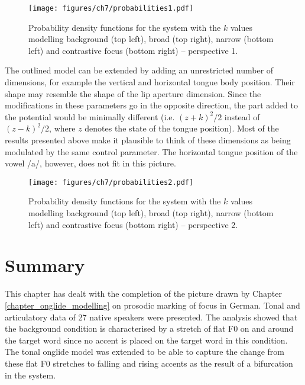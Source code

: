\begin{figure}
	\texttt{[image: figures/ch7/probabilities1.pdf]}
	\caption[Probability density functions for the system with the $k$ values modelling background, broad, narrow and contrastive focus -- perspective 1.]{Probability density functions for the system with the $k$ values modelling background (top left), broad (top right), narrow (bottom left) and contrastive focus (bottom right) -- perspective 1.}
	\label{fig:3d_probs1}
\end{figure}

The outlined model can be extended by adding an unrestricted number of dimensions, for example the vertical and horizontal tongue body position. Their shape may resemble the shape of the lip aperture dimension. Since the modifications in these parameters go in the opposite direction, the part added to the potential would be minimally different (i.e. $(z+k)^2/2$ instead of $(z-k)^2/2$, where $z$ denotes the state of the tongue position). Most of the results presented above make it plausible to think of these dimensions as being modulated by the same control parameter. The horizontal tongue position of the vowel /a/, however, does not fit in this picture.



\begin{figure}[t]
\texttt{[image: figures/ch7/probabilities2.pdf]}
\caption[Probability density functions for the system with the $k$ values modelling background, broad, narrow and contrastive focus -- perspective 2.]{Probability density functions for the system with the $k$ values modelling background (top left), broad (top right), narrow (bottom left) and contrastive focus (bottom right) -- perspective 2.}
\label{fig:3d_probs2}
\end{figure}

\section{Summary}

This chapter has dealt with the completion of the picture drawn by Chapter \ref{chapter_onglide_modelling} on prosodic marking of focus in German. Tonal and articulatory data of 27 native speakers were presented. The analysis showed that the background condition is characterised by a stretch of flat F0 on and around the target word since no accent is placed on the target word in this condition. The tonal onglide model was extended to be able to capture the change from these flat F0 stretches to falling and rising accents as the result of a bifurcation in the system. 

